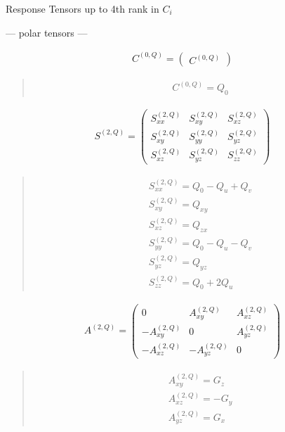 \documentclass[fleqn,10pt]{jsarticle}
\begin{document}
\setcounter{MaxMatrixCols}{16}

\begin{center}
\LARGE
Response Tensors up to 4th rank in $C_{i}$
\end{center}
\begin{center}\LARGE --- polar tensors ---\end{center}
\begin{align*}
C^{(0,Q)} = \begin{pmatrix} C^{(0,Q)} \end{pmatrix}
\end{align*}
\begin{quote}
\begin{align*}
& C^{(0,Q)} = Q_{0}
\end{align*}
\end{quote}
\begin{align*}
S^{(2,Q)} = \begin{pmatrix} S^{(2,Q)}_{xx} & S^{(2,Q)}_{xy} & S^{(2,Q)}_{xz} \\ S^{(2,Q)}_{xy} & S^{(2,Q)}_{yy} & S^{(2,Q)}_{yz} \\ S^{(2,Q)}_{xz} & S^{(2,Q)}_{yz} & S^{(2,Q)}_{zz} \end{pmatrix}
\end{align*}
\begin{quote}
\begin{align*}
& S^{(2,Q)}_{xx} = Q_{0} - Q_{u} + Q_{v} \\
& S^{(2,Q)}_{xy} = Q_{xy} \\
& S^{(2,Q)}_{xz} = Q_{zx} \\
& S^{(2,Q)}_{yy} = Q_{0} - Q_{u} - Q_{v} \\
& S^{(2,Q)}_{yz} = Q_{yz} \\
& S^{(2,Q)}_{zz} = Q_{0} + 2 Q_{u}
\end{align*}
\end{quote}
\begin{align*}
A^{(2,Q)} = \begin{pmatrix} 0 & A^{(2,Q)}_{xy} & A^{(2,Q)}_{xz} \\ - A^{(2,Q)}_{xy} & 0 & A^{(2,Q)}_{yz} \\ - A^{(2,Q)}_{xz} & - A^{(2,Q)}_{yz} & 0 \end{pmatrix}
\end{align*}
\begin{quote}
\begin{align*}
& A^{(2,Q)}_{xy} = G_{z} \\
& A^{(2,Q)}_{xz} = - G_{y} \\
& A^{(2,Q)}_{yz} = G_{x}
\end{align*}
\end{quote}
\end{document}
